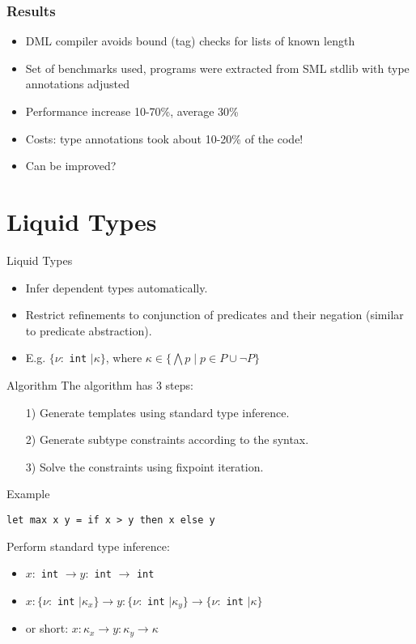 \documentclass[pdf]{beamer}
\begin{document}
\begin{frame}
  \frametitle{Results}

  \begin{itemize}
    \item DML compiler avoids bound (tag) checks for lists of known length
    \item Set of benchmarks used, programs were extracted from SML stdlib with
      type annotations adjusted
    \item Performance increase 10-70\%, average 30\%
    \item Costs: type annotations took about 10-20\% of the code!
    \item Can be improved?
  \end{itemize}
\end{frame}

\section{Liquid Types}
\begin{frame}{Liquid Types}
  \begin{itemize}
    \item Infer dependent types automatically.
    \item Restrict refinements to conjunction of predicates and their negation (similar to predicate abstraction).
    \item E.g. $\{\nu:$ \lstinline{int} $\mid \kappa\}$, where $\kappa \in \{\bigwedge p \mid p \in P \cup \neg P\}$
  \end{itemize}
\end{frame}

\begin{frame}{Algorithm}
  The algorithm has 3 steps:
  \begin{itemize}
    \item[1)] Generate templates using standard type inference.
    \item[2)] Generate subtype constraints according to the syntax.
    \item[3)] Solve the constraints using fixpoint iteration.
  \end{itemize}
\end{frame}

\begin{frame}[fragile]{Example}
  \begin{lstlisting}
let max x y = if x > y then x else y
  \end{lstlisting}
  Perform standard type inference:
  \begin{itemize}
    \item $x:$ \lstinline{int} $\rightarrow y:$ \lstinline{int} $\rightarrow$ \lstinline{int}
    \item $x: \{\nu:$ \lstinline{int} $\mid \kappa_x\} \rightarrow y: \{\nu:$ \lstinline{int} $\mid \kappa_y\} \rightarrow \{\nu:$ \lstinline{int} $\mid \kappa\}$
    \item or short: $x: \kappa_x \rightarrow y: \kappa_y \rightarrow \kappa$
  \end{itemize}
\end{frame}
\end{document}
